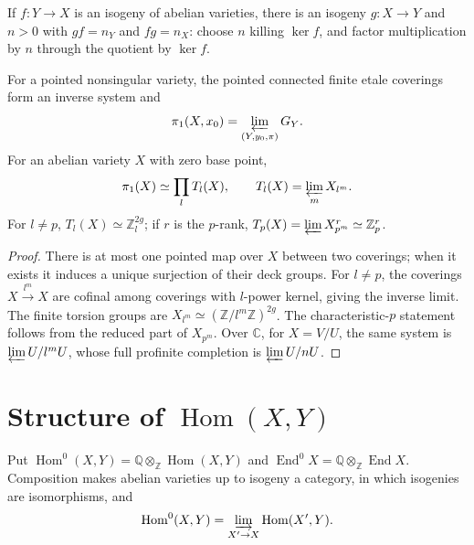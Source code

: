 \begin{remark}
\label{mumford-rem-isogeny-quasi-inverse}
If $f:Y\to X$ is an isogeny of abelian varieties, there is an isogeny
$g:X\to Y$ and $n>0$ with $g f=n_Y$ and $f g=n_X$: choose $n$ killing
$\ker f$, and factor multiplication by $n$ through the quotient by $\ker f$.
\end{remark}

\begin{proposition}
\label{mumford-prop-etale-coverings-av}
\label{mumford-def-tate-module}
\label{mumford-prop-galois-tate-action}
For a pointed nonsingular variety, the pointed connected finite etale
coverings form an inverse system and
\[
\pi_1(X,x_0)=\varprojlim_{(Y,y_0,\pi)}G_Y.
\]
For an abelian variety $X$ with zero base point,
\[
\pi_1(X)\simeq\prod_lT_l(X),\qquad T_l(X)=\varprojlim_mX_{l^m}.
\]
For $l\ne p$, $T_l(X)\simeq\mathbb Z_l^{2g}$; if $r$ is the $p$-rank,
$T_p(X)=\varprojlim X^r_{p^m}\simeq\mathbb Z_p^r$.
\end{proposition}
\begin{proof}
There is at most one pointed map over $X$ between two coverings; when it
exists it induces a unique surjection of their deck groups. For $l\ne p$,
the coverings $X\xrightarrow{l^m}X$ are cofinal among coverings with
$l$-power kernel, giving the inverse limit. The finite torsion groups are
$X_{l^m}\simeq(\mathbb Z/l^m\mathbb Z)^{2g}$. The characteristic-$p$
statement follows from the reduced part of $X_{p^m}$. Over $\mathbb C$,
for $X=V/U$, the same system is $\varprojlim U/l^mU$, whose full profinite
completion is $\varprojlim U/nU$.
\end{proof}

\section{Structure of $\operatorname{Hom}(X,Y)$}
\label{mumford-IV19-source}

\begin{definition}
\label{mumford-def-hom-up-to-isogeny}
Put
$\operatorname{Hom}^0(X,Y)=\mathbb Q\otimes_\mathbb Z\operatorname{Hom}(X,Y)$
and $\operatorname{End}^0X=\mathbb Q\otimes_\mathbb Z\operatorname{End}X$.
Composition makes abelian varieties up to isogeny a category, in which
isogenies are isomorphisms, and
\[
\operatorname{Hom}^0(X,Y)=\varinjlim_{X'\to X}\operatorname{Hom}(X',Y).
\]
\end{definition}

